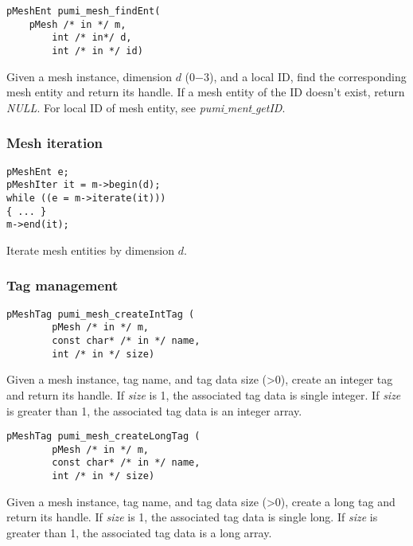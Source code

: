 \begin{verbatim}
pMeshEnt pumi_mesh_findEnt(
	pMesh /* in */ m, 
        int /* in*/ d, 
        int /* in */ id)
\end{verbatim}
Given a mesh instance, dimension $d$ ($0$$-$$3$), and a local ID, find the corresponding mesh entity and return its handle. If a mesh entity of the ID doesn't exist, return \emph{NULL}. For local ID of mesh entity, see \emph{pumi$\_$ment$\_$getID}.

\subsubsection{Mesh iteration}\label{mIter}

\begin{verbatim}
pMeshEnt e;
pMeshIter it = m->begin(d);
while ((e = m->iterate(it)))
{ ... }
m->end(it);
\end{verbatim}\vspace{-.5cm}\hspace{1cm}

Iterate mesh entities by dimension $d$.

\subsubsection{Tag management}
\begin{verbatim}
pMeshTag pumi_mesh_createIntTag ( 
        pMesh /* in */ m, 
        const char* /* in */ name, 
        int /* in */ size)
\end{verbatim}\vspace{-.5cm}\hspace{1cm}
Given a mesh instance, tag name, and tag data size (>0), create an integer tag and return its handle.
If \emph{size} is 1, the associated tag data is single integer. If \emph{size} is greater than 1, the associated tag data is an integer array.

\begin{verbatim}
pMeshTag pumi_mesh_createLongTag (
        pMesh /* in */ m, 
        const char* /* in */ name, 
        int /* in */ size)
\end{verbatim}\vspace{-.5cm}\hspace{1cm}

Given a mesh instance, tag name, and tag data size (>0), create a long tag and return its handle.
If \emph{size} is 1, the associated tag data is single long. If \emph{size} is greater than 1, the associated tag data is a long array.

